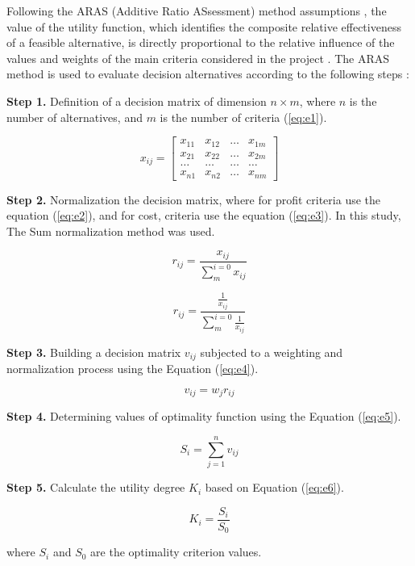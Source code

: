 
Following the ARAS (Additive Ratio ASsessment) method assumptions \cite{stanujkic2015selection}, the value of the utility function, which identifies the composite relative effectiveness of a feasible alternative, is directly proportional to the relative influence of the values and weights of the main criteria considered in the project \cite{zavadskas2010new}. The ARAS method is used to evaluate decision alternatives according to the following steps \cite{ghram2019multiple}:

\noindent \textbf{Step 1.} Definition of a decision matrix of dimension $n \times m$, where $n$ is the number of alternatives, and $m$ is the number of criteria (\ref{eq:e1}).

\begin{equation}
    x_{i j}=\left[\begin{array}{llll}
    x_{11} & x_{12} & \ldots & x_{1 m} \\
    x_{21} & x_{22} & \ldots & x_{2 m} \\
    \ldots & \ldots & \ldots & \ldots \\
    x_{n 1} & x_{n 2} & \ldots & x_{n m}
    \end{array}\right]
\label{eq:e1}
\end{equation}

\noindent \textbf{Step 2.} Normalization the decision matrix, where for profit criteria use the equation (\ref{eq:e2}), and for cost, criteria use the equation (\ref{eq:e3}). In this study, The Sum normalization method was used.

\begin{equation}
    r_{ij} = \frac{x_{ij}}{\sum_m^{i=0}x_{ij}}
\label{eq:e2}
\end{equation}

\begin{equation}
    r_{ij} = \frac{\frac{1}{x_{ij}}}{\sum_m^{i=0}\frac{1}{x_{ij}}}
\label{eq:e3}
\end{equation}

\noindent \textbf{Step 3.} Building a decision matrix $v_{ij}$ subjected to a weighting and normalization process using the Equation (\ref{eq:e4}).

\begin{equation}
    v_{ij} = w_{j}r_{ij} \label{weighted}
\label{eq:e4}
\end{equation}

\noindent \textbf{Step 4.} Determining values of optimality function using the Equation (\ref{eq:e5}).


\begin{equation}
    S_i = \sum_{j=1}^{n} v_{ij}
\label{eq:e5}
\end{equation}

\noindent \textbf{Step 5.} Calculate the utility degree $K_i$ based on Equation (\ref{eq:e6}).

\begin{equation}
    K_i = \frac{S_i}{S_0}
\label{eq:e6}
\end{equation}

where $S_i$ and $S_0$ are the optimality criterion values.
